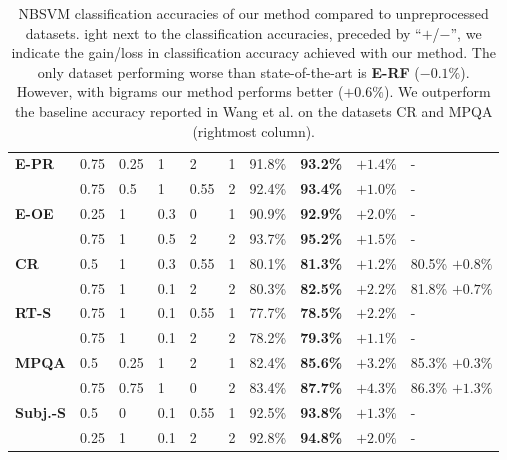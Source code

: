 \begin{table}
{\begin{tabular}{l|lllll|llll}
\textbf{E-PR}    & 0.75 & 0.25     & 1       & 2        & 1       & 91.8\% & \textbf{93.2\%} &$+1.4 \%$        & -                                    \\
                 & 0.75 & 0.5      & 1       & 0.55     & 2       & 92.4\% & \textbf{93.4\%} &$+1.0 \%$        & -                                    \\ \hline
\textbf{E-OE}    & 0.25 & 1        & 0.3     & 0        & 1       & 90.9\% & \textbf{92.9\%} &$+2.0 \%$        & -                                    \\
                 & 0.75 & 1        & 0.5     & 2        & 2       & 93.7\% & \textbf{95.2\%} &$+1.5 \%$        & -                                    \\ \hline \hline
\textbf{CR}      & 0.5  & 1        & 0.3     & 0.55     & 1       & 80.1\% & \textbf{81.3\%} &$+1.2 \%$        & 80.5\% $+0.8\%$                     \\
                 & 0.75 & 1        & 0.1     & 2        & 2       & 80.3\% & \textbf{82.5\%} &$+2.2 \%$        & 81.8\% $+0.7\%$                     \\ \hline
\textbf{RT-S}    & 0.75 & 1        & 0.1     & 0.55     & 1       & 77.7\% & \textbf{78.5\%} &$+2.2 \%$        & -                                    \\
                 & 0.75 & 1        & 0.1     & 2        & 2       & 78.2\% & \textbf{79.3\%} &$+1.1 \%$        & -                                    \\ \hline
\textbf{MPQA}    & 0.5  & 0.25     & 1       & 2        & 1       & 82.4\% & \textbf{85.6\%} &$+3.2 \%$        & 85.3\% $+0.3\%$                     \\
                 & 0.75 & 0.75     & 1       & 0        & 2       & 83.4\% & \textbf{87.7\%} &$+4.3 \%$ 	      & 86.3\% $+1.3\%$                     \\ \hline
\textbf{Subj.-S} & 0.5  & 0        & 0.1     & 0.55     & 1       & 92.5\% & \textbf{93.8\%} &$+1.3 \%$	      & -                                    \\
                 & 0.25 & 1        & 0.1     & 2        & 2       & 92.8\% & \textbf{94.8\%} &$+2.0 \%$        & -                                    \\ \hline
\end{tabular}
}
\caption{NBSVM classification accuracies of our method compared to unpreprocessed datasets. ight next to the classification accuracies, preceded by ``$+$/$-$'', we indicate the gain/loss in classification accuracy 
achieved with our method. The only dataset performing worse than state-of-the-art is \textbf{E-RF} ($-0.1\%$). However, with bigrams our method performs better ($+0.6\%$).
We outperform the baseline accuracy reported in Wang et al. \cite{wang2012baselines} on the datasets CR and MPQA (rightmost column).}
\label{tbl:results-10-fold-NBSVM-acc}
\end{table}

